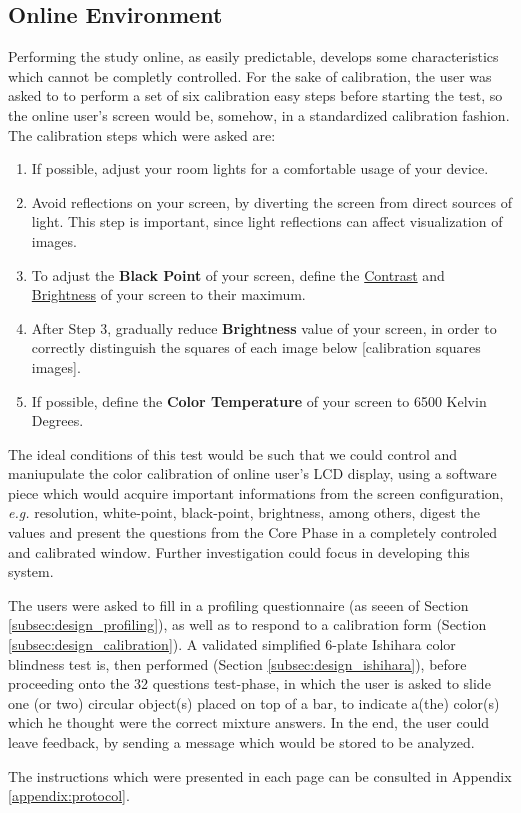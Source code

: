 \subsection{Online Environment}
%
Performing the study online, as easily predictable, develops some characteristics which cannot be completly controlled. For the sake of calibration, the user was asked to
to perform a set of six calibration easy steps before starting the test, so the online user's screen would be,
somehow, in a standardized calibration fashion. The calibration steps which were asked are:
%
\begin{enumerate}
  \item If possible, adjust your room lights for a comfortable usage of your device.
  \item Avoid reflections on your screen, by diverting the screen from direct sources of light. This step is important,
  since light reflections can affect visualization of images.
  \item To adjust the \textbf{Black Point} of your screen, define the \ul{Contrast} and \ul{Brightness} of your screen to their maximum.
  \item After Step 3, gradually reduce \textbf{Brightness} value of your screen, in order to correctly distinguish the squares of each image below [calibration squares images].
  \item If possible, define the \textbf{Color Temperature} of your screen to 6500 Kelvin Degrees.
\end{enumerate} \par
%
The ideal conditions of this test would be such that we could control and maniupulate the color calibration of online user's LCD display, using a software
piece which would acquire important informations from the screen configuration, \emph{e.g.} resolution, white-point, black-point, brightness, among others,
digest the values and present the questions from the Core Phase in a completely controled and calibrated window. Further investigation could focus in
developing this system. \par
%
The users were asked to fill in a profiling questionnaire (as seeen of Section \ref{subsec:design_profiling}), as well as to respond to a calibration form
(Section \ref{subsec:design_calibration}). A validated simplified 6-plate Ishihara color blindness test \cite{Alwis1992} is, then performed
(Section \ref{subsec:design_ishihara}), before proceeding onto the 32 questions test-phase, in which the user is asked to slide one (or two) circular
object(s) placed on top of a bar, to indicate a(the) color(s) which he thought were the correct mixture answers. In the end, the user could leave
feedback, by sending a message which would be stored to be analyzed. \par
%
The instructions which were presented in each page can be consulted in Appendix \ref{appendix:protocol}.
%
